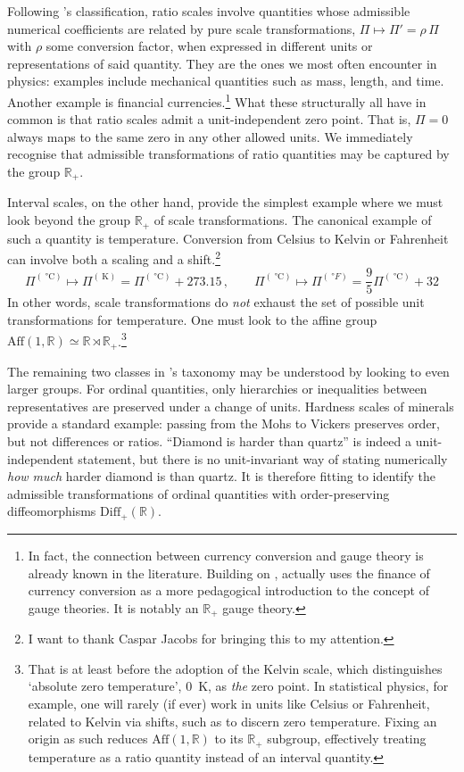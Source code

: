 \documentclass[12pt]{article}
\numberwithin{equation}{section}
\newcommand{\R}{\mathbb{R}}
\begin{document}
Following \citeauthor{Stevens1946}'s classification, ratio scales involve quantities whose admissible numerical coefficients are related by pure scale transformations, $\Pi \mapsto \Pi ' = \rho\,\Pi$ with $\rho$ some conversion factor, when expressed in different units or representations of said quantity. They are the ones we most often encounter in physics: examples include mechanical quantities such as mass, length, and time. Another example is financial currencies.\footnote{In fact, the connection between currency conversion and gauge theory is already known in the literature. Building on \citet{Young1999}, \citet{Maldacena2015} actually uses the finance of currency conversion as a more pedagogical introduction to the concept of gauge theories. It is notably an $\R_+$ gauge theory.} What these structurally all have in common is that ratio scales admit a unit-independent zero point. That is, $\Pi=0$ always maps to the same zero in any other allowed units. We immediately recognise that admissible transformations of ratio quantities may be captured by the group $\R_+$. 

Interval scales, on the other hand, provide the simplest example where we must look beyond the group $\R_+$ of scale transformations. The canonical example of such a quantity is temperature. Conversion from Celsius to Kelvin or Fahrenheit can involve both a scaling and a shift.\footnote{I want to thank Caspar Jacobs for bringing this to my attention.}
\begin{equation}
    \Pi^{(\SI{}{\celsius})} \mapsto \Pi^{(\SI{}{\kelvin})} = \Pi^{(\SI{}{\celsius})} + 273.15\,,\qquad \Pi^{(\SI{}{\celsius})} \mapsto \Pi^{(\SI{}{\degree F})} = \frac{9}{5}\Pi^{(\SI{}{\celsius})} + 32
\end{equation}
In other words, scale transformations do \emph{not} exhaust the set of possible unit transformations for temperature. One must look to the affine group $\mathrm{Aff}(1,\R)\simeq \R\rtimes \R_+$.\footnote{That is at least before the adoption of the Kelvin scale, which distinguishes `absolute zero temperature', \SI{0}{\kelvin}, as \emph{the} zero point. In statistical physics, for example, one will rarely (if ever) work in units like Celsius or Fahrenheit, related to Kelvin via shifts, such as to discern zero temperature. Fixing an origin as such reduces $\mathrm{Aff}(1,\R)$ to its $\R_+$ subgroup, effectively treating temperature as a ratio quantity instead of an interval quantity.} 

The remaining two classes in \citeauthor{Stevens1946}'s taxonomy may be understood by looking to even larger groups. For ordinal quantities, only hierarchies or inequalities between representatives are preserved under a change of units. Hardness scales of minerals provide a standard example: passing from the Mohs to Vickers preserves order, but not differences or ratios. ``Diamond is harder than quartz'' is indeed a unit-independent statement, but there is no unit-invariant way of stating numerically \emph{how much} harder diamond is than quartz. It is therefore fitting to identify the admissible transformations of ordinal quantities with order-preserving diffeomorphisms $\mathrm{Diff}_+(\R)$. 
\end{document}
